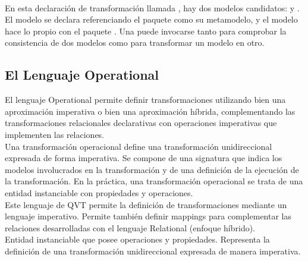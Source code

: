 \\

En esta declaración de transformación llamada , hay dos modelos candidatos:  y . El modelo  se declara referenciando el paquete  como su metamodelo, y el modelo  hace lo propio con el paquete . Una  puede invocarse tanto para comprobar la consistencia de dos modelos como para transformar un modelo en otro.\\

\subsection{El Lenguaje Operational}

El lenguaje Operational permite definir transformaciones utilizando bien una aproximación imperativa o bien una aproximación híbrida, complementando las transformaciones relacionales declarativas con operaciones imperativas que implementen las relaciones.\\

Una transformación operacional define una transformación unidireccional expresada de forma imperativa. Se compone de una signatura que indica los modelos involucrados en la transformación y de una definición de la ejecución de la transformación. En la práctica, una transformación operacional se trata de una entidad instanciable con propiedades y operaciones.\\

Este lenguaje de QVT permite la definición de transformaciones mediante un lenguaje imperativo. Permite también definir  mappings para complementar las relaciones desarrolladas con el lenguaje Relational (enfoque híbrido).\\

Entidad instanciable que posee operaciones y propiedades. Representa la definición de una transformación unidireccional expresada de manera imperativa.